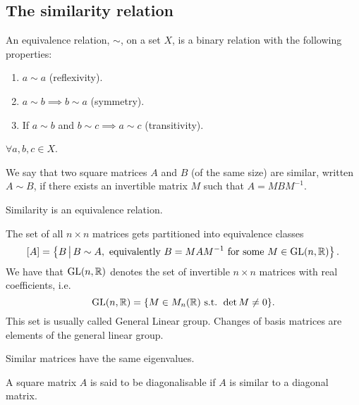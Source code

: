 \documentclass[10pt, a4paper]{article}
\begin{document}
\subsection{The similarity relation}
\begin{definition}
    An equivalence relation,
    $\sim$,
    on a set $X$,
    is a binary relation with the following properties:
    \begin{enumerate}[label = (\roman*)]
        \item $a \sim a$
        (reflexivity).
        
        \item $a \sim b \implies b \sim a$
        (symmetry).

        \item If $a \sim b$ and $b \sim c \implies a \sim c$
        (transitivity).
    \end{enumerate}
    $\forall a, b, c \in X$.
\end{definition}

\begin{definition}
    We say that two square matrices $A$ and $B$
    (of the same size)
    are similar,
    written $A \sim B$,
    if there exists an invertible matrix $M$ such that $A = MBM ^ {-1}$.
\end{definition}

\begin{proposition}
    Similarity is an equivalence relation.
\end{proposition}

The set of all $n \times n$ matrices gets partitioned into equivalence classes
\[
\left[A\right] = \left\{B \,\middle|\, B \sim A, \text{ equivalently } B = MAM ^ {-1}\text{ for some } M \in \mathrm{GL}(n, \mathbb{R})\right\}.
\]
We have that $\mathrm{GL}(n, \mathbb{R})$ denotes the set of invertible $n \times n$ matrices with real coefficients,
i.e.
\[
\mathrm{GL}(n, \mathbb{R}) = \{M \in M_n(\mathbb{R})\text{ s.t. } \det{M} \neq 0\}.
\]
This set is usually called General Linear group.
Changes of basis matrices are elements of the general linear group.

\begin{proposition}
    Similar matrices have the same eigenvalues.
\end{proposition}

\begin{definition}
    A square matrix $A$ is said to be diagonalisable if $A$ is similar to a diagonal matrix.
\end{definition}
\end{document}
